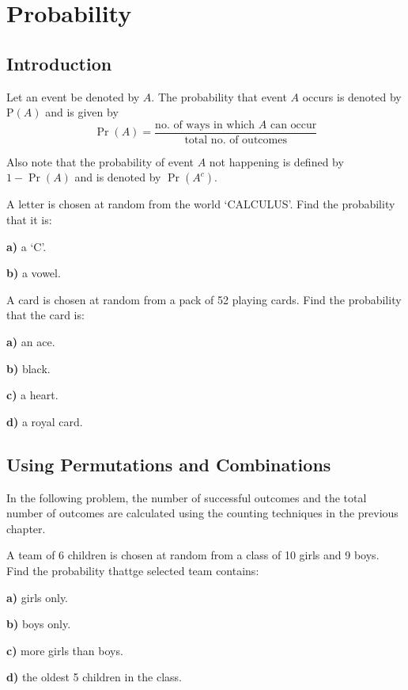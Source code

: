 \usetikzlibrary{backgrounds,calc}


	\chapter{Probability}
	\section{Introduction}
	Let an event be denoted by $A$. The probability that event $A$ occurs is denoted by P$(A)$ and is given by \[\Pr(A) = \frac{\text{no. of ways in which } A \text{ can occur}}{\text{total no. of outcomes}}\]
	
	Also note that the probability of event $A$ not happening is defined by $1-\Pr(A)$ and is denoted by $\Pr(A^c)$.
	
	\begin{example}
		A letter is chosen at random from the world `CALCULUS'. Find the probability that it is:
		
		\quad \textbf{a) } a `C'.
		
		\quad \textbf{b) } a vowel.
	\end{example}

\begin{example}
	A card is chosen at random from a pack of 52 playing cards. Find the probability that the card is: 
	
	\quad \textbf{a) } an ace.
	
	\quad \textbf{b) } black.
	
	\quad \textbf{c) } a heart.
	
	\quad \textbf{d) } a royal card.
\end{example}
	\section{Using Permutations and Combinations}
	
	In the following problem, the number of successful outcomes and the total number of outcomes are calculated using the counting techniques in the previous chapter.
	
	\begin{example}
		A team of 6 children is chosen at random from a class of 10 girls and 9 boys. Find the probability thattge selected team contains:
		
		\quad \textbf{a) } girls only.
		
		\quad \textbf{b) } boys only.
			
		\quad \textbf{c) } more girls than boys.
		
		\quad \textbf{d) } the oldest 5 children in the class.
		
	\end{example}
